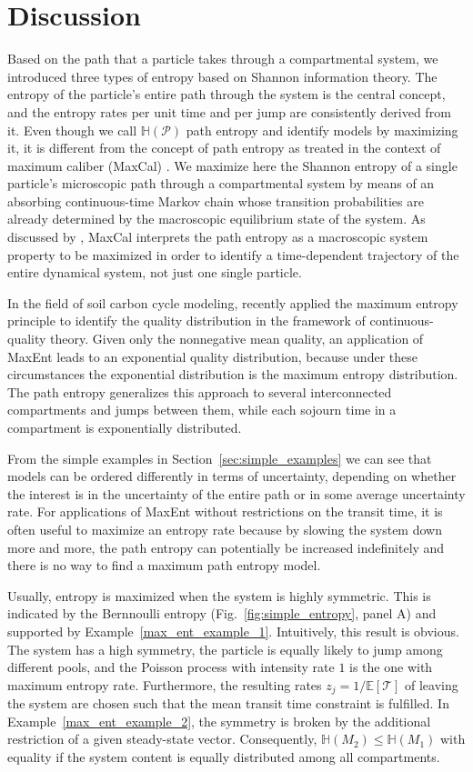\documentclass[smallextended]{svjour3}
\newcommand{\E}{\mathbb{E}}
\newcommand{\TT}{\mathcal{T}}
\renewcommand{\H}{\mathbb{H}}
\begin{document}
\section{Discussion}
Based on the path that a particle takes through a compartmental system, we introduced three types of entropy based on Shannon information theory.
The entropy of the particle's entire path through the system is the central concept, and the entropy rates per unit time and per jump are consistently derived from it.
Even though we call $\H(\mathcal{P})$ path entropy and identify models by maximizing it, it is different from the concept of path entropy as treated in the context of maximum caliber (MaxCal) \citep{jaynes1985macroscopic}.
We maximize here the Shannon entropy of a single particle's microscopic path through a compartmental system by means of an absorbing continuous-time Markov chain whose transition probabilities are already determined by the macroscopic equilibrium state of the system.
As discussed by \citet{Presse2013RMP}, MaxCal interprets the path entropy as a macroscopic system property to be maximized in order to identify a time-dependent trajectory of the entire dynamical system, not just one single particle.

In the field of soil carbon cycle modeling, \citet{Agren2021BGC} recently applied the maximum entropy principle to identify the quality distribution in the framework of continuous-quality theory.
Given only the nonnegative mean quality, an application of MaxEnt leads to an exponential quality distribution, because under these circumstances the exponential distribution is the maximum entropy distribution.
The path entropy generalizes this approach to several interconnected compartments and jumps between them, while each sojourn time in a compartment is exponentially distributed.

From the simple examples in Section~\ref{sec:simple_examples} we can see that models can be ordered differently in terms of uncertainty, depending on whether the interest is in the uncertainty of the entire path or in some average uncertainty rate.
For applications of MaxEnt without restrictions on the transit time, it is often useful to maximize an entropy rate because by slowing the system down more and more, the path entropy can potentially be increased indefinitely and there is no way to find a maximum path entropy model.

Usually, entropy is maximized when the system is highly symmetric.
This is indicated by the Bernnoulli entropy (Fig.~\ref{fig:simple_entropy}, panel A) and supported by Example~\ref{max_ent_example_1}.
Intuitively, this result is obvious.
The system has a high symmetry, the particle is equally likely to jump among different pools, and the Poisson process with intensity rate $1$ is the one with maximum entropy rate.
Furthermore, the resulting rates $z_j = 1/\E\left[\TT\right]$ of leaving the system are chosen such that the mean transit time constraint is fulfilled. 
In Example~\ref{max_ent_example_2}, the symmetry is broken by the additional restriction of a given steady-state vector.
Consequently, $\H(M_2) \leq \H(M_1)$ with equality if the system content is equally distributed among all compartments.
\end{document}
